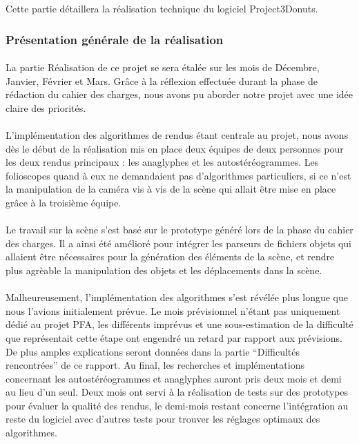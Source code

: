 Cette partie détaillera la réalisation technique du logiciel Project3Donuts.

\subsubsection{Présentation générale de la réalisation}
\paragraph{}
La partie Réalisation de ce projet se sera étalée sur les mois de Décembre, Janvier, Février et Mars. Grâce à la réflexion effectuée durant la phase de rédaction du cahier des charges, nous avons pu aborder notre projet avec une idée claire des priorités.

\paragraph{}
L'implémentation des algorithmes de rendus étant centrale au projet, nous avons dès le début de la réalisation mis en place deux équipes de deux personnes pour les deux rendus principaux : les anaglyphes et les autostéréogrammes. Les folioscopes quand à eux ne demandaient pas d'algorithmes particuliers, si ce n'est la manipulation de la caméra vis à vis de la scène qui allait être mise en place grâce à la troisième équipe.

\paragraph{}
Le travail sur la scène s'est basé sur le prototype généré lors de la phase du cahier des charges. Il a ainsi été amélioré pour intégrer les parseurs de fichiers objets qui allaient être nécessaires pour la génération des éléments de la scène, et rendre plus agrèable la manipulation des objets et les déplacements dans la scène.

\paragraph{}
Malheureusement, l'implémentation des algorithmes s'est révélée plus longue que nous l'avions initialement prévue. Le mois prévisionnel n'étant pas uniquement dédié au projet PFA, les différents imprévus et une sous-estimation de la difficulté que représentait cette étape ont engendré un retard par rapport aux prévisions. De plus amples explications seront données dans la partie ``Difficultés rencontrées'' de ce rapport. 
Au final, les recherches et implémentations concernant les autostéréogrammes et anaglyphes auront pris deux mois et demi au lieu d'un seul. Deux mois ont servi à la réalisation de tests sur des prototypes pour évaluer la qualité des rendus, le demi-mois restant concerne l'intégration au reste du logiciel avec d'autres tests pour trouver les réglages optimaux des algorithmes.

